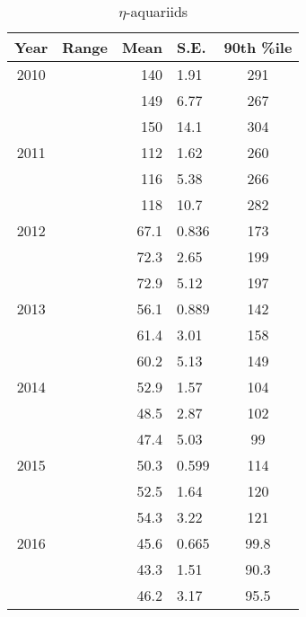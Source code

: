 \documentclass[a4paper,12pt,twocolumn]{report}
\begin{document}
\begin{appendices}
\begin{table*}
	\centering
	\begin{tabular}{|c|c|r@{ \,$\pm$\, }l|c|}
		\hline 
		Year & Range & Mean & S.E. & 90th \%ile\\ 
		\hline 
		2010 & & 140 & 1.91 & 291   \\ 
		\hline 
		& &	149 & 6.77 & 267   \\ 
		\hline 
		& & 150 & 14.1 & 304   \\ 
		\hline 
		2011 & & 112 & 1.62 & 260   \\ 
		\hline 
		& & 116 & 5.38 & 266   \\ 
		\hline 
		& & 118 & 10.7 & 282   \\ 
		\hline 
		2012 & & 67.1 & 0.836 & 173   \\ 
		\hline 
		& & 72.3 & 2.65 & 199   \\ 
		\hline 
		& & 72.9 & 5.12 & 197   \\ 
		\hline 
		2013 & & 56.1 & 0.889 & 142   \\ 
		\hline 
		& & 61.4 & 3.01 & 158   \\ 
		\hline 
		& & 60.2 & 5.13 & 149   \\ 
		\hline 
		2014 & & 52.9 & 1.57 & 104   \\ 
		\hline 
		& & 48.5 & 2.87 & 102   \\ 
		\hline 
		& & 47.4 & 5.03 & 99  \\ 
		\hline 
		2015 & & 50.3 & 0.599 & 114   \\ 
		\hline 
		& & 52.5 & 1.64 & 120   \\ 
		\hline 
		& & 54.3 & 3.22 & 121   \\ 
		\hline
		2016 & & 45.6 & 0.665 & 99.8	\\
		\hline 
		& & 43.3 & 1.51 & 90.3   \\ 
		\hline 
		& & 46.2 & 3.17 & 95.5   \\ 
		\hline 
	\end{tabular}
	\caption{$\eta$-aquariids} 
\end{table*}
\end{appendices}
\printbibliography
\end{document}
